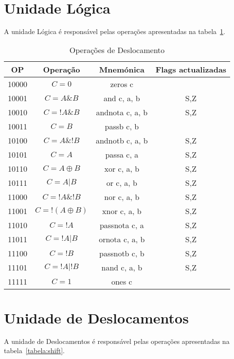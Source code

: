 \documentclass[11pt,a4paper,titlepage,onecolumn]{report}
\begin{document}
	\section{Unidade Lógica}
	
	A unidade Lógica é responsável pelas operações apresentadas na tabela~\ref{tabela:logic}.\\
	
	\begin{table}[h]
		\centering
		\begin{tabular}{|c|c|c|c|}
			\hline
			OP    & Operação & Mnemónica & Flags actualizadas \\ \hline
			10000 & \mbox{$C=0$}    & zeros c   &   \\ \hline
			10001 & \mbox{$C=A\&B$}  & and c, a, b & S,Z   \\ \hline
			10010 & \mbox{$C=!A\&B$}  & andnota c, a, b & S,Z   \\ \hline
			10011 & \mbox{$C=B$}  & passb c, b &    \\ \hline
			10100 & \mbox{$C=A\&!B$}  & andnotb c, a, b & S,Z   \\ \hline
			10101 & \mbox{$C=A$}  & passa c, a & S,Z   \\ \hline
			10110 & \mbox{$C=A \oplus B$}  & xor c, a, b & S,Z   \\ \hline
			10111 & \mbox{$C=A|B$}  & or c, a, b & S,Z   \\ \hline
			11000 & \mbox{$C=!A\&!B$}  & nor c, a, b & S,Z   \\ \hline
			11001 & \mbox{$C=!(A \oplus B)$}  & xnor c, a, b & S,Z   \\ \hline
			11010 & \mbox{$C=!A$}  & passnota c, a & S,Z   \\ \hline
			11011 & \mbox{$C=!A|B$}  & ornota c, a, b & S,Z   \\ \hline
			11100 & \mbox{$C=!B$}  & passnotb c, b & S,Z   \\ \hline
			11101 & \mbox{$C=!A|!B$}  & nand c, a, b & S,Z   \\ \hline
			11111 & \mbox{$C=1$}  & ones c &    \\ \hline
		\end{tabular}
		\caption{Operações de Deslocamento}
		\label{tabela:logic}
	\end{table}
	
	\section{Unidade de Deslocamentos}
	A unidade de Deslocamentos é responsável pelas operações apresentadas na tabela~\ref{tabela:shift}.\\
	
\end{document}
